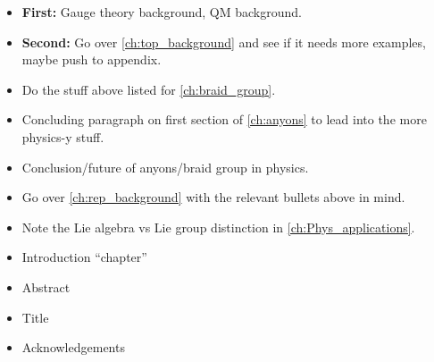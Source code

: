 \begin{itemize}
    \begin{center}\rule{.85\textwidth}{0.65pt}\end{center}
    \item[\checkmark] \textbf{First:} Gauge theory background, QM background.
    \item[\checkmark]  \textbf{Second:} Go over \cref{ch:top_background} and see if it needs more examples, maybe push to appendix.
    \item[\checkmark] Do the stuff above listed for \cref{ch:braid_group}.
    \item[\qedsymbol] Concluding paragraph on first section of \cref{ch:anyons} to lead into the more physics-y stuff.
    \item[\qedsymbol] Conclusion/future of anyons/braid group in physics.
    \item[\qedsymbol] Go over \cref{ch:rep_background} with the relevant bullets above in mind.
    \item[\qedsymbol] Note the Lie algebra vs Lie group distinction in \cref{ch:Phys_applications}.
    \item[\qedsymbol] Introduction ``chapter''
    \item[\qedsymbol] Abstract
    \item[\qedsymbol] Title
    \item[\qedsymbol] Acknowledgements
\end{itemize}
